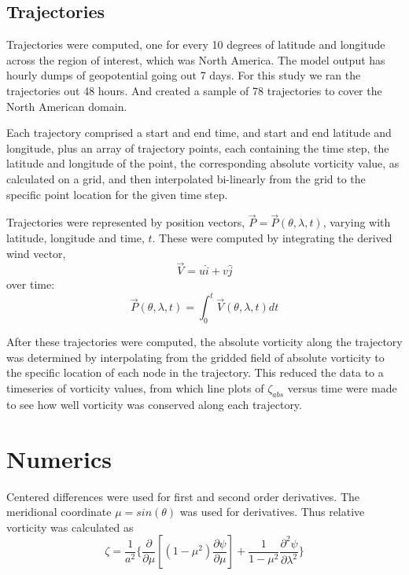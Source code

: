 \documentclass{article}
\begin{document}
\subsection{Trajectories}
Trajectories were computed,
one for every 10 degrees of latitude and longitude across the region of
interest, which was North America. The model output has hourly dumps of geopotential going out 7 days. For this study we ran the trajectories out 48 hours.  And created a sample of 78 trajectories to cover the North American domain.

Each trajectory comprised a start and end time, and start and end latitude and longitude, plus an array of trajectory points, each containing the time step, the latitude and longitude of the point, the corresponding absolute vorticity value, as calculated on a grid, and then interpolated bi-linearly from the grid to the specific point location for the given time step.

Trajectories were represented by position vectors,
$\vec{P} = \vec{P}(\theta,\lambda,t)$, varying with latitude, longitude and time, $t$. These were computed by integrating the derived wind vector,
\begin{equation}
  \vec{V} = u \hat{i} + v \hat{j}
\end{equation}
over time:
\begin{equation}
  \vec{P}(\theta,\lambda, t) =  \int_{0}^{t}
  \vec{V}(\theta ,\lambda ,t)  dt
\end{equation}

After these trajectories were computed,
the absolute vorticity along the trajectory was determined by interpolating from the
gridded field of absolute vorticity to the specific location of each node in the trajectory. This reduced the data to a timeseries of vorticity values, from which
line plots of $\zeta_{abs}$ versus time were made
to see how well vorticity was conserved along each trajectory.

\section{Numerics}

Centered differences were used for first and second order derivatives. The meridional coordinate $\mu = sin(\theta)$ was used for derivatives.
Thus relative vorticity was calculated as
\begin{equation}
  \zeta = \frac{1}{a^{2}}\{ 
     \frac{\partial}{\partial \mu} 
     [ ( 1 - \mu^{2})\frac{\partial \psi}{\partial \mu} ]
     + \frac{1}{1 - \mu^2} \frac{\partial^2 \psi}{\partial \lambda^2}
     \}
  \end{equation}
  
\end{document}

